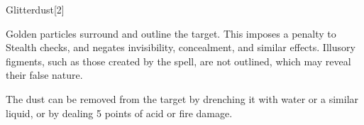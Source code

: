 \begin{spellsection}{Glitterdust}[2]
    \begin{spellheader}
    \end{spellheader}
    \begin{spellcontent}
        \begin{spelltargetinginfo}
        \end{spelltargetinginfo}
        \begin{spelleffects}
            \spelleffect Golden particles surround and outline the target. This imposes a  penalty to Stealth checks, and negates invisibility, concealment, and similar effects. Illusory figments, such as those created by the  spell, are not outlined, which may reveal their false nature.

            The dust can be removed from the target by drenching it with water or a similar liquid, or by dealing 5 points of acid or fire damage.
            \spelldur \durshort
        \end{spelleffects}
    \end{spellcontent}
    \begin{spellfooter}
        \miscastyou
    \end{spellfooter}
\end{spellsection}

